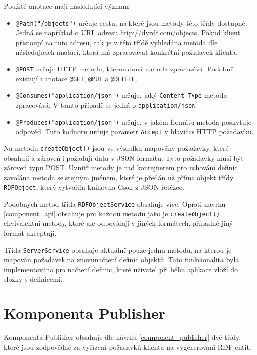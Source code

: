 \documentclass[thesis=B,czech]{FITthesis}[2012/06/26]
\begin{document}
 \newpage
  Použité anotace mají následující význam:
  \begin{itemize}
   \item \texttt{@Path("/objects")} určuje cestu, na které jsou metody této třídy dostupné. Jedná se například o URL adresu
   \url{http://dyrdf.com/objects}. Pokud klient přistoupí na tuto adresu, tak je v této třídě vyhledána metoda dle následujících anotací, která má zpracovávat
   konkrétní požadavek klienta.
   
   \item \texttt{@POST} určuje HTTP metodu, kterou daná metoda zpracovává. Podobně existují i anotace \texttt{@GET}, \texttt{@PUT} a \texttt{@DELETE}.
   
   \item \texttt{@Consumes("application/json")} určuje, jaký \texttt{Content Type} \cite{content_type} metoda zpracovává. V tomto případě se jedná o 
   \texttt{application/json}.
   
   \item \texttt{@Produces("application/json")} určuje, v jakém formátu metoda poskytuje odpověď. Tuto hodnotu určuje parametr \texttt{Accept} v hlavičce HTTP požadavku.
  \end{itemize}
  
  Na metodu \texttt{createObject()} jsou ve výsledku mapovány požadavky, které obsahují a zároveň i požadují data v JSON formátu. Tyto požadavky musí být 
  zároveň typu POST. Uvnitř metody je nad kontejnerem pro uchování definic zavolána metoda se stejným jménem, které je předán už přímo objekt
  třídy \texttt{RDFObject}, který vytvořila knihovna Gson \cite{gson} z JSON řetězce.
 
  Podobných metod třída \texttt{RDFObjectService} obsahuje více. Oproti návrhu \ref{component_api} obsahuje pro každou metodu jako je \texttt{createObject()} 
  ekvivalentní metody, které ale odpovídají v jiných formátech, případně jiný formát akceptují.
  
  Třída \texttt{ServerService} obsahuje aktuálně pouze jednu metodu, na kterou je mapován požadavek na znovunačtení definic objektů. Tato funkcionalita
  byla implementována pro načtení definic, které uživatel při běhu aplikace vloží do složky s	 definicemi.
  
  \section{Komponenta Publisher}\label{impl_publisher}
  Komponenta Publisher obsahuje dle návrhu \ref{component_publisher} dvě třídy, které jsou zodpovědné za vyřízení požadavků klienta na vygenerování RDF entit.
  
\end{document}
